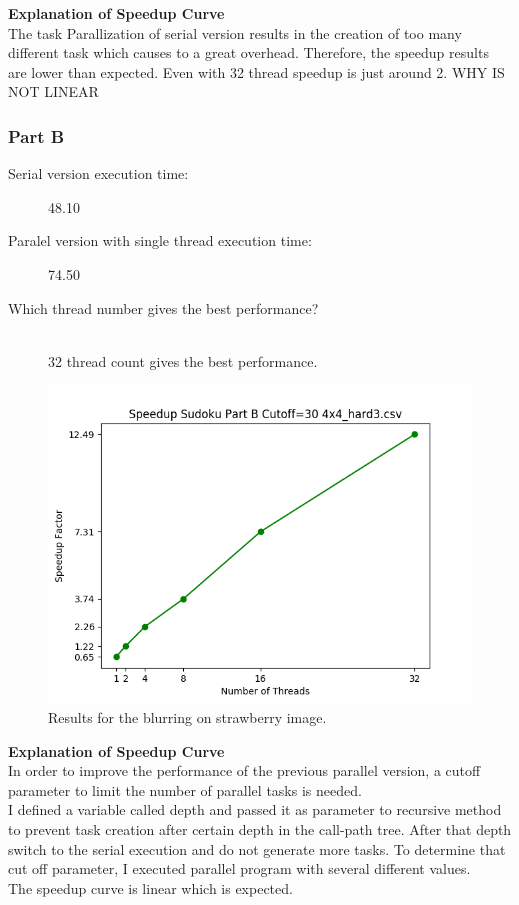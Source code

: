 \documentclass{article}
\newcommand\tab[1][0.5cm]{\hspace*{#1}}
\begin{document}
\textbf{Explanation of Speedup Curve}\\
\tab The task Parallization of serial version results in the creation of too many different task
which causes to a great overhead.
Therefore, the speedup results are lower than expected. Even with 32 thread speedup is just around 2.
\tab WHY IS NOT LINEAR
\newpage

\subsubsection{Part B}

\begin{description}
\item[Serial version execution time: ] 48.10
\item[Paralel version with single thread execution time: ] 74.50
\item[Which thread number gives the best performance?]\hfill \\
32 thread count gives the best performance.

\end{description} 
\begin{figure}[!htb]
        \centering
        \includegraphics[width=1\linewidth]{./img/speedup_part_2_B.png}
        \caption{Results for the blurring on strawberry image.}
\end{figure}
\textbf{Explanation of Speedup Curve}\\
\tab In order to improve the performance of the previous parallel version, a cutoff parameter 
to limit the number of parallel tasks is needed.\\
\tab I defined a variable called depth and passed it as parameter to recursive method  
to prevent task creation after certain depth in the call-path tree. 
After that depth switch to the serial execution and do not generate more tasks.
To determine that cut off parameter, I executed parallel program with several
different values.\\
\tab The speedup curve is linear which is expected.  
\end{document}
